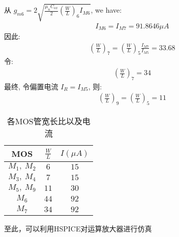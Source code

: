     \indent 从  $ g_{m6} = 2\sqrt{\frac{\mu_nC_{ox}}{2}(\frac{W}{L})_6I_{M6}} $, we have: \\
    \begin{align} 
        I_{M6} = I_{M7} = 91.8646\mu A 
    \end{align}
    \indent 因此: 
    \begin{align} 
        (\frac{W}{L})_7 = (\frac{W}{L})_5\frac{I_{M7}}{I_{M5}} = 33.68 
    \end{align}
    \indent 令:
    \begin{align} 
        (\frac{W}{L})_7 = 34 
    \end{align}
    \indent 最终, 令偏置电流 $ I_R = I_{M5} $, 则: 
    \begin{align} 
        (\frac{W}{L})_9 = (\frac{W}{L})_5 = 11 
    \end{align}
    \begin{table}[H]
        \centering
        \begin{tabular}{|c|c|c|}
        \hline
        MOS & $ \frac{W}{L} $ & $ I(\mu A) $ \\ \hline
        $ M_1,\ M_2 $ & $ 6 $ & $ 15 $ \\ \hline
        $ M_3,\ M_4 $ & $ 7 $  & $ 15 $ \\ \hline
        $ M_5,\ M_9 $ & $ 11 $ & $ 30 $ \\ \hline
        $ M_6 $ & $ 44 $ & $ 92 $ \\ \hline
        $ M_7 $ & $ 34 $  & $ 92 $ \\ \hline
        \end{tabular}
        \caption{各MOS管宽长比以及电流}
    \end{table}

    至此，可以利用HSPICE对运算放大器进行仿真\\
